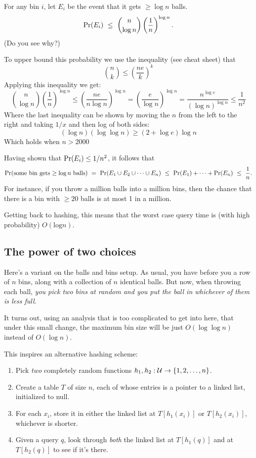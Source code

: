 For any bin $i$, let $E_i$ be the event that it gets $\geq \log n$ balls.
$$ \mbox{\rm Pr}(E_i) \  \leq \ {n \choose \log n} \left( \frac{1}{n} \right)^{\log n} .$$
(Do you see why?) 

To upper bound this probability we use the inequality (see cheat sheet) that
\[
{n \choose k} \leq \left( \frac{ne}{k} \right)^k
\]
Applying this inequality we get:
\[
{n \choose \log n} \left( \frac{1}{n} \right)^{\log n} \leq 
\left( \frac{ne}{n \log n}  \right)^{\log n} =
\left( \frac{e}{\log n}  \right)^{\log n} =
\frac{n^{\log e}}{(\log n)^{\log n}} \leq \frac{1}{n^2}
\]
Where the last inequality can be shown by moving the $n$ from the left
to the right and taking $1/x$ and then log of both sides:
\[
(\log n)(\log \log n) \geq (2+\log e) \log n
\]
Which holds when $n>2000$

Having shown that $\mbox{\rm Pr}(E_i) \leq 1/n^2$, it follows that
$$ \pr(\mbox{some bin gets $\geq \log n$ balls})
\ = \ 
\pr(E_1 \cup E_2 \cup \cdots \cup E_n)
\ \leq \ 
\pr(E_1) + \cdots + \pr(E_n) 
\ \leq \ 
\frac{1}{n}.
$$
For instance, if you throw a million balls into a million bins, then the chance that
there is a bin with $\geq 20$ balls is at most 1 in a million.

Getting back to hashing, this means that the worst case query time is (with high
probability) $O(\mbox{log} n)$.

\subsection{The power of two choices}

Here's a variant on the balls and bins setup. As usual, you have before you a 
row of $n$ bins, along with a collection of $n$ identical balls. But now, 
when throwing each ball, {\it you pick two bins at random and you put the
ball in whichever of them is less full}.

It turns out, using an analysis that is too complicated to get into here, that
under this small change, the maximum bin size will be just $O(\log \log n)$ 
instead of $O(\log n)$.

This inspires an alternative hashing scheme:

\begin{enumerate}
\item Pick {\it two} completely random functions $h_1, h_2: {\cal U} \rightarrow \{1,2,\ldots, n\}$. 

\item Create a table $T$ of size $n$, each of whose entries is a pointer to a 
linked list, initialized to null. 

\item For each $x_i$, store it in either the linked list at $T[h_1(x_i)]$ or $T[h_2(x_i)]$,
whichever is shorter.

\item Given a query $q$, look through {\it both} the linked list at $T[h_1(q)]$ and
at $T[h_2(q)]$ to see if it's there.
\end{enumerate}

